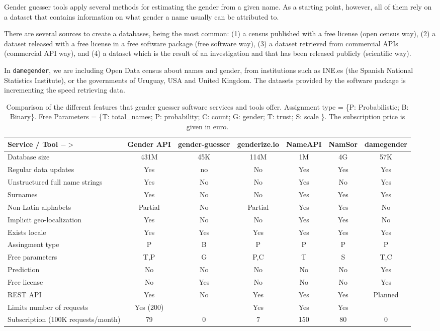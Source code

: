 \documentclass[a4paper]{article}
\def\infinity{\rotatebox{90}{8}}
\begin{document}
Gender guesser tools apply several methods for estimating the gender from a given name. 
As a starting point, however, all of them rely on a dataset that contains information on what gender a name usually can be attributed to.

There are several sources to create a databases, being the most common:  
(1) a census published with a free license (open census way), 
(2) a dataset released with a free license in a free software package (free software way), 
(3) a dataset retrieved from commercial APIs (commercial API way), and
(4) a dataset which is the result of an investigation and that has been released publicly (scientific way).

In \texttt{damegender}, we are including Open Data census about names and gender, from institutions such as INE.es (the Spanish National Statistics Institute), or the governments of Uruguay, USA and United Kingdom. The datasets provided by the software package is incrementing the speed retrieving data.

\begin{table*}[ht]
\footnotesize
\begin{tabular}[]{lcccccc}
\hline
Service / Tool $->$ & Gender API & gender-guesser & genderize.io & NameAPI & NamSor & damegender\tabularnewline
\hline
Database size & 431M & 45K & 114M & 1M & 4G & 57K \tabularnewline
Regular data updates & Yes & no & No & Yes & Yes & Yes\tabularnewline
Unstructured full name strings & Yes & No & No & Yes & No & Yes\tabularnewline
Surnames & Yes & No & No & Yes & Yes & Yes\tabularnewline
Non-Latin alphabets & Partial & No & Partial & Yes & Yes & No\tabularnewline
Implicit geo-localization & Yes & No & No & Yes & Yes & No\tabularnewline
Exists locale & Yes & Yes & Yes & Yes & Yes & Yes\tabularnewline
Assingment type & P & B & P & P & P & P \tabularnewline
Free parameters & T,P & G & P,C & T & S & T,C\tabularnewline
Prediction & No & No & No & No & No & Yes\tabularnewline
Free license & No & Yes & No & No & No & Yes\tabularnewline
REST API & Yes & No & Yes & Yes & Yes & Planned\tabularnewline
Limits number of requests & Yes (200) & \infinity & Yes & Yes & Yes & \infinity \tabularnewline
Subscription (100K requests/month)	 & 79 & 0 & 7 & 150 & 80 & 0 \tabularnewline
\hline
\end{tabular}
\caption{Comparison of the different features that gender guesser software services and tools offer. Assignment type = \{P: Probabilistic; B: Binary\}. Free Parameters = \{T: total\_names; P: probability; C: count; G: gender; T: trust; S: scale \}. The subscription price is given in euro.}
\label{table:comparison}
\end{table*}
\end{document}
